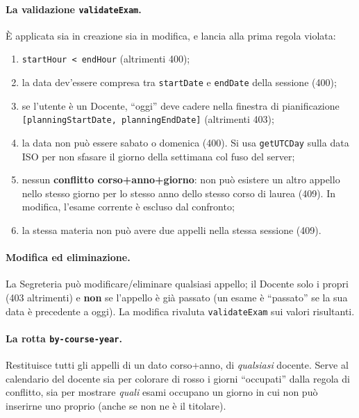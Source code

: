 \documentclass[11pt,a4paper,oneside]{report}
\newcommand{\code}[1]{\texttt{\small #1}}
\begin{document}
\paragraph{La validazione \code{validateExam}.} È applicata sia in creazione sia
in modifica, e lancia alla prima regola violata:

\begin{enumerate}[leftmargin=1.6em]
  \item \code{startHour < endHour} (altrimenti 400);
  \item la data dev'essere compresa tra \code{startDate} e \code{endDate} della
        sessione (400);
  \item se l'utente è un Docente, ``oggi'' deve cadere nella finestra di
        pianificazione \code{[planningStartDate, planningEndDate]} (altrimenti
        403);
  \item la data non può essere sabato o domenica (400). Si usa \code{getUTCDay}
        sulla data ISO per non sfasare il giorno della settimana col fuso del
        server;
  \item nessun \textbf{conflitto corso+anno+giorno}: non può esistere un altro
        appello nello stesso giorno per lo stesso anno dello stesso corso di
        laurea (409). In modifica, l'esame corrente è escluso dal confronto;
  \item la stessa materia non può avere due appelli nella stessa sessione (409).
\end{enumerate}

\paragraph{Modifica ed eliminazione.} La Segreteria può modificare/eliminare
qualsiasi appello; il Docente solo i propri (403 altrimenti) e \textbf{non} se
l'appello è già passato (un esame è ``passato'' se la sua data è precedente a
oggi). La modifica rivaluta \code{validateExam} sui valori risultanti.

\paragraph{La rotta \code{by-course-year}.} Restituisce tutti gli appelli di un
dato corso+anno, di \emph{qualsiasi} docente. Serve al calendario del docente sia
per colorare di rosso i giorni ``occupati'' dalla regola di conflitto, sia per
mostrare \emph{quali} esami occupano un giorno in cui non può inserirne uno
proprio (anche se non ne è il titolare).
\end{document}
